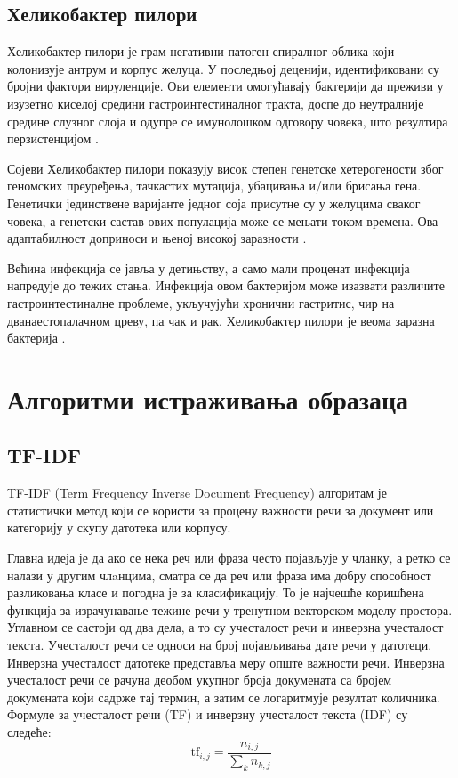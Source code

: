 \documentclass[12pt]{article}
\begin{document}
\subsection{Хеликобактер пилори}

Хеликобактер пилори је грам-негативни патоген спиралног облика који колонизује антрум и корпус желуца. У последњој деценији, идентификовани су бројни фактори вируленције. Ови елементи омогућавају бактерији да преживи у изузетно киселој средини гастроинтестиналног тракта, доспе до неутралније средине слузног слоја и одупре се имунолошком одговору човека, што резултира перзистенцијом \cite{2022helicobacter}.

Сојеви Хеликобактер пилори показују висок степен генетске хетерогености због геномских преуређења, тачкастих мутација, убацивања и/или брисања гена. Генетички јединствене варијанте једног соја присутне су у желуцима сваког човека, а генетски састав ових популација може се мењати током времена. Ова адаптабилност доприноси и њеној високој заразности \cite{Noto2012-rr}.

Већина инфекција се јавља у детињству, а само мали проценат инфекција напредује до тежих стања. Инфекција овом бактеријом може изазвати различите гастроинтестиналне проблеме, укључујући хронични гастритис, чир на дванаестопалачном цреву, па чак и рак. Хеликобактер пилори је веома заразна бактерија \cite{2022helicobacter}.

\section{Алгоритми истраживања образаца}

\subsection{TF-IDF}

TF-IDF\cite{Liu2018-oa} (Term Frequency Inverse Document Frequency) алгоритам
 је
статистички метод који се користи за процену важности речи
за документ или категорију у скупу датотека или корпусу. 

Главна идеја је да ако се нека реч или фраза често појављује у
чланку, а ретко се налази у другим члaнцима, сматра се
да реч или фраза има добру способност разликовања класе
и погодна је за класификацију. То је најчешће коришћена
функција за израчунавање тежине речи у тренутном
векторском моделу простора. Углавном се састоји од
два дела, а то су учесталост речи и инверзна учесталост
текста. Учесталост речи се односи на број појављивања
дате речи у датотеци. Инверзна учесталост датотеке представља
меру опште важности речи. Инверзна учесталост речи се рачуна деобом
укупног броја докумената са бројем
докумената који садрже тај термин, а затим се логаритмује
резултат количника. Формуле за учесталост речи (TF) и
инверзну учесталост текста (IDF) су следеће:
$$\mathrm{tf}_{i,j} = \frac{n_{i,j}}{\sum_{k} n_{k,j}}$$
\end{document}
